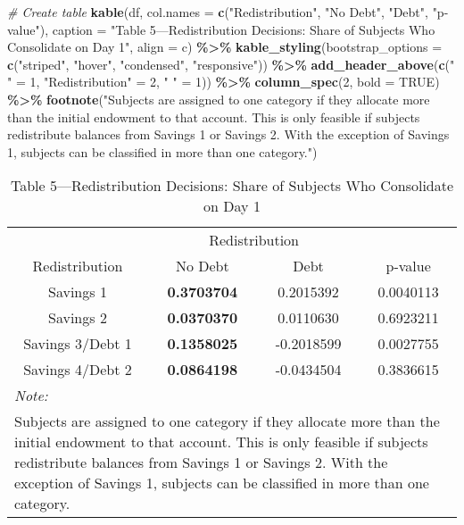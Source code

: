 \documentclass[
]{article}
\newenvironment{Shaded}{\begin{snugshade}}{\end{snugshade}}
\newcommand{\AttributeTok}[1]{\textcolor[rgb]{0.13,0.29,0.53}{#1}}
\newcommand{\CommentTok}[1]{\textcolor[rgb]{0.56,0.35,0.01}{\textit{#1}}}
\newcommand{\ConstantTok}[1]{\textcolor[rgb]{0.56,0.35,0.01}{#1}}
\newcommand{\DecValTok}[1]{\textcolor[rgb]{0.00,0.00,0.81}{#1}}
\newcommand{\FunctionTok}[1]{\textcolor[rgb]{0.13,0.29,0.53}{\textbf{#1}}}
\newcommand{\NormalTok}[1]{#1}
\newcommand{\OtherTok}[1]{\textcolor[rgb]{0.56,0.35,0.01}{#1}}
\newcommand{\SpecialCharTok}[1]{\textcolor[rgb]{0.81,0.36,0.00}{\textbf{#1}}}
\newcommand{\StringTok}[1]{\textcolor[rgb]{0.31,0.60,0.02}{#1}}
\begin{document}
\begin{Shaded}
\begin{Highlighting}[]
\CommentTok{\# Create table}
\FunctionTok{kable}\NormalTok{(df, }\AttributeTok{col.names =} \FunctionTok{c}\NormalTok{(}\StringTok{"Redistribution"}\NormalTok{, }\StringTok{"No Debt"}\NormalTok{, }\StringTok{"Debt"}\NormalTok{, }\StringTok{"p{-}value"}\NormalTok{), }\AttributeTok{caption =} \StringTok{"Table 5—Redistribution Decisions: Share of Subjects Who Consolidate on Day 1"}\NormalTok{, }\AttributeTok{align =} \StringTok{\textquotesingle{}c\textquotesingle{}}\NormalTok{) }\SpecialCharTok{\%\textgreater{}\%}
  \FunctionTok{kable\_styling}\NormalTok{(}\AttributeTok{bootstrap\_options =} \FunctionTok{c}\NormalTok{(}\StringTok{"striped"}\NormalTok{, }\StringTok{"hover"}\NormalTok{, }\StringTok{"condensed"}\NormalTok{, }\StringTok{"responsive"}\NormalTok{)) }\SpecialCharTok{\%\textgreater{}\%}
  \FunctionTok{add\_header\_above}\NormalTok{(}\FunctionTok{c}\NormalTok{(}\StringTok{" "} \OtherTok{=} \DecValTok{1}\NormalTok{, }\StringTok{"Redistribution"} \OtherTok{=} \DecValTok{2}\NormalTok{, }\StringTok{" "} \OtherTok{=} \DecValTok{1}\NormalTok{)) }\SpecialCharTok{\%\textgreater{}\%}
  \FunctionTok{column\_spec}\NormalTok{(}\DecValTok{2}\NormalTok{, }\AttributeTok{bold =} \ConstantTok{TRUE}\NormalTok{) }\SpecialCharTok{\%\textgreater{}\%}
  \FunctionTok{footnote}\NormalTok{(}\StringTok{"Subjects are assigned to one category if they allocate more than the initial endowment to that account. This is only feasible if subjects redistribute balances from Savings 1 or Savings 2. With the exception of Savings 1, subjects can be classified in more than one category."}\NormalTok{)}
\end{Highlighting}
\end{Shaded}

\begin{longtable}[t]{c>{}ccc}
\caption{\label{tab:Table 5}Table 5—Redistribution Decisions: Share of Subjects Who Consolidate on Day 1}\\
\toprule
\multicolumn{1}{c}{ } & \multicolumn{2}{c}{Redistribution} & \multicolumn{1}{c}{ } \\
\cmidrule(l{3pt}r{3pt}){2-3}
Redistribution & No Debt & Debt & p-value\\
\midrule
Savings 1 & \textbf{0.3703704} & 0.2015392 & 0.0040113\\
Savings 2 & \textbf{0.0370370} & 0.0110630 & 0.6923211\\
Savings 3/Debt 1 & \textbf{0.1358025} & -0.2018599 & 0.0027755\\
Savings 4/Debt 2 & \textbf{0.0864198} & -0.0434504 & 0.3836615\\
\bottomrule
\multicolumn{4}{l}{\rule{0pt}{1em}\textit{Note: }}\\
\multicolumn{4}{l}{\rule{0pt}{1em}Subjects are assigned to one category if they allocate more than the initial endowment to that account. This is only feasible if subjects redistribute balances from Savings 1 or Savings 2. With the exception of Savings 1, subjects can be classified in more than one category.}\\
\end{longtable}
\end{document}
